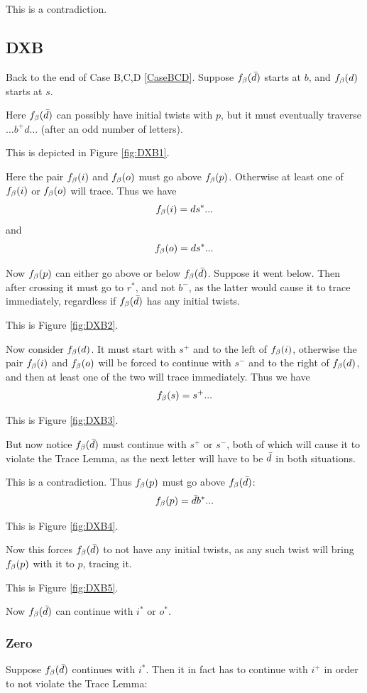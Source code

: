 This is a contradiction.

\subsection{DXB} \label{DXB}
Back to the end of Case B,C,D \ref{CaseBCD}. Suppose $f_\beta(\bar{d})$ starts at $b$, and $f_\beta(d)$ starts at $s$. 

Here $f_\beta(\bar{d})$ can possibly have initial twists with $p$, but it must eventually traverse $...b^+d...$ (after an odd number of letters). 

This is depicted in Figure \ref{fig:DXB1}.

Here the pair $f_\beta(i)$ and $f_\beta(o)$ must go above $f_\beta(p)$. Otherwise at least one of $f_\beta(i)$ or $f_\beta(o)$ will trace. Thus we have
\[
f_\beta(i) = d s^*...
\]
and
\[
f_\beta(o) = d s^*...
\]

Now $f_\beta(p)$ can either go above or below $f_\beta(\bar{d})$. Suppose it went below. Then after crossing it must go to $r^*$, and not $b^-$, as the latter would cause it to trace immediately, regardless if $f_\beta(\bar{d})$ has any initial twists.

This is Figure \ref{fig:DXB2}.

Now consider $f_\beta(d)$. It must start with $s^+$ and to the left of $f_\beta(i)$, otherwise the pair $f_\beta(i)$ and $f_\beta(o)$ will be forced to continue with $s^-$ and to the right of $f_\beta(d)$, and then at least one of the two will trace immediately. Thus we have
\[
f_\beta(s) = s^+...
\]

This is Figure \ref{fig:DXB3}.

But now notice $f_\beta(\bar{d})$ must continue with $s^+$ or $s^-$, both of which will cause it to violate the Trace Lemma, as the next letter will have to be $\bar{d}$ in both situations. 

This is a contradiction. Thus $f_\beta(p)$ must go above $f_\beta(\bar{d})$:
\[
f_\beta(p) = \bar{d} b^*...
\]

This is Figure \ref{fig:DXB4}.

Now this forces $f_\beta(\bar{d})$ to not have any initial twists, as any such twist will bring $f_\beta(p)$ with it to $p$, tracing it.

This is Figure \ref{fig:DXB5}.

Now $f_\beta(\bar{d})$ can continue with $i^*$ or $o^*$.

\subsubsection{Zero}\label{Zero}
Suppose $f_\beta(\bar{d})$ continues with $i^*$. Then it in fact has to continue with $i^+$ in order to not violate the Trace Lemma:

